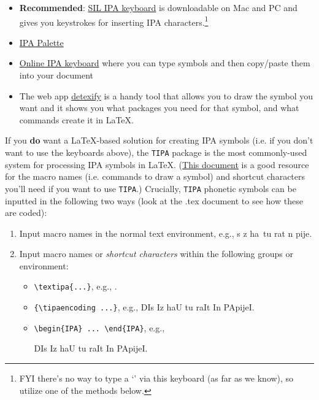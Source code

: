 \documentclass{article}
\begin{document}
\begin{itemize}

    \item \textbf{Recommended}: \href{https://scripts.sil.org/cms/scripts/page.php?site_id=nrsi&id=uniipakeyboard}{SIL IPA keyboard} is downloadable on Mac and PC and gives you keystrokes for inserting IPA characters.\footnote{FYI there's no way to type a `\textrhookschwa' via this keyboard (as far as we know), so utilize one of the methods below.}
    
    \item \href{https://www.blugs.com/IPA/}{IPA Palette}
    
    \item \href{https://ipa.typeit.org}{Online IPA keyboard} where you can type symbols and then copy/paste them into your document
    
    \item The web app \href{http://detexify.kirelabs.org/classify.html}{detexify} is a handy tool that allows you to draw the symbol you want and it shows you what packages you need for that symbol, and what commands create it in \LaTeX{}.

\end{itemize}

\noindent If you \textbf{do} want a \LaTeX{}-based solution for creating IPA symbols (i.e. if you don't want to use the keyboards above), the \texttt{TIPA} package is the most commonly-used system for processing IPA symbols in \LaTeX{}. (\href{https://www.tug.org/TUGboat/tb17-2/tb51rei.pdf}{This document} is a good resource for the macro names (i.e. commands to draw a symbol) and shortcut characters you'll need if you want to use \texttt{TIPA}.) Crucially, \texttt{TIPA} phonetic symbols can be inputted in the following two ways (look at the .tex document to see how these are coded):
\begin{enumerate}
    \item Input macro names in the normal text environment, e.g., \dh\textsci s \textsci z ha\textupsilon\ tu ra\textsci t \textsci n \textglotstop\textscripta pije\textsci.
    \item Input macro names or \textit{shortcut characters} within the following groups or environment:
    \begin{itemize}
        \item \verb|\textipa{...}|, e.g., 
            .
        \item \verb|{\tipaencoding ...}|, e.g., 
            {\tipaencoding DIs Iz haU tu raIt In PApijeI}.
        \item \verb|\begin{IPA} ... \end{IPA}|, e.g.,
            \begin{IPA}
            DIs Iz haU tu raIt In PApijeI.
            \end{IPA}
    \end{itemize}
\end{enumerate}
\end{document}
